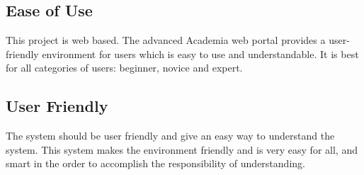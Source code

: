 \subsection{Ease of Use}

This project is web based. The advanced Academia web portal provides a user-friendly environment for users which is easy to use and understandable. It is best for all categories of users: beginner, novice and expert.

\subsection{User Friendly}

The system should be user friendly and give an easy way to understand the system. This system makes the environment friendly and is very easy for all, and smart in the order to accomplish the responsibility of understanding.
